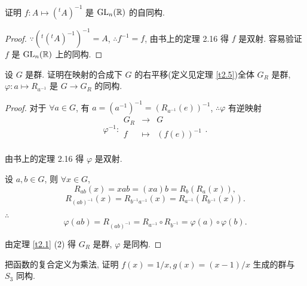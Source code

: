 \documentclass[color=black,device=normal,lang=cn,mode=geye]{elegantnote}
\begin{document}
\begin{exercisec}[5.2.26]
    证明 $f:A\mapsto({}^tA)^{-1}$ 是 $\operatorname{GL}_n(\mathbb{R})$ 的自同构.
\end{exercisec}
\begin{proof}
    $\because({}^t({}^tA)^{-1})^{-1}=A$, $\therefore f^{-1}=f$, 由书上的定理 2.16 得 $f$ 是双射. 容易验证 $f$ 是 $\operatorname{GL}_n(\mathbb{R})$ 上的同构.
\end{proof}
\begin{exercisec}[5.2.27]\label{exc5.2.27}
    设 $G$ 是群. 证明在映射的合成下 $G$ 的右平移(定义见定理 \ref{t2.5})全体 $G_R$ 是群, $\varphi:a\mapsto R_{a^{-1}}$ 是 $G\to G_R$ 的同构.
\end{exercisec}
\begin{proof}
    对于 $\forall a\in G$, 有 $a=(a^{-1})^{-1}=(R_{a^{-1}}(e))^{-1}$, $\therefore\varphi$ 有逆映射
    \[\varphi^{-1}:\begin{array}{rcl}
        G_R & \to & G \\
        f & \mapsto & (f(e))^{-1} \\
    \end{array}.\]

    由书上的定理 2.16 得 $\varphi$ 是双射.

    设 $a,b\in G$, 则 $\forall x\in G$,
    \[R_{ab}(x)=xab=(xa)b=R_b(R_a(x)),\]
    \[R_{(ab)^{-1}}(x)=R_{b^{-1}a^{-1}}(x)=R_{a^{-1}}(R_{b^{-1}}(x)).\]

    $\therefore$
    \[\varphi(ab)=R_{(ab)^{-1}}=R_{a^{-1}}\circ R_{b^{-1}}=\varphi(a)\circ\varphi(b).\]

    由定理 \ref{t2.1} (2) 得 $G_R$ 是群, $\varphi$ 是同构.
\end{proof}
\begin{exercisec}[5.2.28]\label{exc5.2.28}
    把函数的复合定义为乘法, 证明 $f(x)=1/x,g(x)=(x-1)/x$ 生成的群与 $S_3$ 同构.
\end{exercisec}
\end{document}
